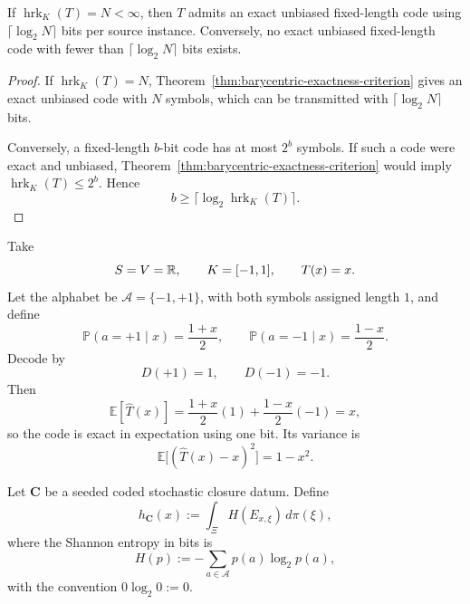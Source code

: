 \begin{corollary}
\label{cor:exact-fixed-length-stochastic-rate}
If \(\operatorname{hrk}_{K}(T)=N<\infty\), then \(T\) admits an exact unbiased
fixed-length code using \(\lceil \log_2 N\rceil\) bits per source instance.
Conversely, no exact unbiased fixed-length code with fewer than
\(\lceil \log_2 N\rceil\) bits exists.
\end{corollary}

\begin{proof}
If \(\operatorname{hrk}_{K}(T)=N\), Theorem~\ref{thm:barycentric-exactness-criterion}
gives an exact unbiased code with \(N\) symbols, which can be transmitted with
\(\lceil \log_2 N\rceil\) bits.

Conversely, a fixed-length \(b\)-bit code has at most \(2^b\) symbols. If such
a code were exact and unbiased, Theorem~\ref{thm:barycentric-exactness-criterion}
would imply \(\operatorname{hrk}_{K}(T)\le 2^b\). Hence
\[
b\ge \lceil \log_2 \operatorname{hrk}_{K}(T)\rceil.
\]
\end{proof}

\begin{example}
\label{ex:one-bit-unbiased-scalar-closure}
Take
\[
S=V=\mathbb{R},
\qquad
K=[-1,1],
\qquad
T(x)=x.
\]
Let the alphabet be \(\mathcal A=\{-1,+1\}\), with both symbols assigned length
\(1\), and define
\[
\mathbb P(a=+1\mid x)=\frac{1+x}{2},
\qquad
\mathbb P(a=-1\mid x)=\frac{1-x}{2}.
\]
Decode by
\[
D(+1)=1,
\qquad
D(-1)=-1.
\]
Then
\[
\mathbb E[\widehat T(x)]
=
\frac{1+x}{2}(1)+\frac{1-x}{2}(-1)
=
x,
\]
so the code is exact in expectation using one bit. Its variance is
\[
\mathbb E\bigl[(\widehat T(x)-x)^2\bigr]=1-x^2.
\]
\end{example}

\begin{definition}
\label{def:closure-entropy-profile}
Let \(\mathbf C\) be a seeded coded stochastic closure datum. Define
\[
h_{\mathbf C}(x)
:=
\int_{\Xi} H(E_{x,\xi})\,d\pi(\xi),
\]
where the Shannon entropy in bits is
\[
H(p):=-\sum_{a\in\mathcal A} p(a)\log_2 p(a),
\]
with the convention \(0\log_2 0:=0\).
\end{definition}

